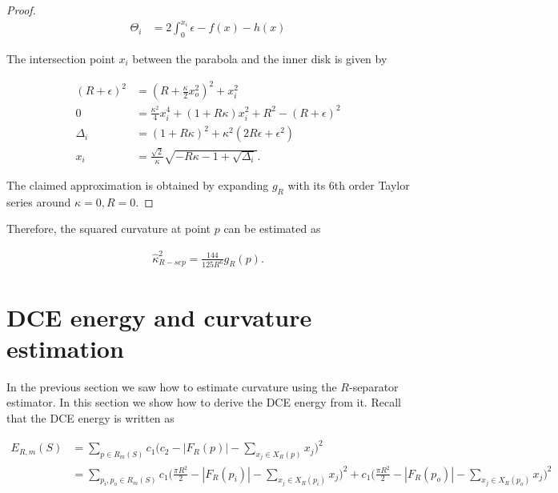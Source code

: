 \begin{proof}
\begin{align*}
	\Theta_i &= 2\int_{0}^{x_i}{\epsilon - f(x) - h(x)}	\end{align*}

The intersection point $x_i$ between the parabola and the inner disk is given by
	
\begin{align*}
	(R+\epsilon)^2 &= (R+\frac{\kappa}{2}x_o^2)^2 + x_i^2\\
	0 &= \frac{\kappa^2}{4}x_i^4 + (1+R\kappa)x_i^2 + R^2 - (R+\epsilon)^2	\\
\Delta_i &= (1+R\kappa)^2 + \kappa^2(2R\epsilon + \epsilon^2)\\
x_i &= \frac{\sqrt{2}}{\kappa}\sqrt{-R\kappa-1+\sqrt{\Delta_i}}.
\end{align*}

The claimed approximation is obtained by expanding $g_R$ with its  6th order Taylor series around $\kappa=0,R=0$.
\end{proof}

Therefore, the squared curvature at point $p$ can be estimated as

\begin{align*}
	\hat{\kappa}_{R-sep} ^2 = \frac{144}{125R^6}g_R(p) .
\end{align*}

\section{DCE energy and curvature estimation}

In the previous section we saw how to estimate curvature using the $R$-separator estimator. In this section we show how to derive the DCE energy from it. Recall that the DCE energy is written as

\begin{align*}
  E_{R,m}(S) &=  \sum_{p \in R_m(S)}{ c_1\Big( c_2 - |F_{R}(p)| - \sum_{x_j \in X_R(p)} {x_j} \Big)^2 } \\
  	  &= \sum_{p_i,p_o \in R_m(S)} c_1\Big( \frac{\pi R^2}{2} - |F_{R}(p_i)| - \sum_{x_j \in X_{R}(p_{i})} {x_j} \Big)^2 + c_1\Big( \frac{\pi R^2}{2} - |F_{R}(p_o)| - \sum_{x_j \in X_{R}(p_{o})} {x_j} \Big)^2
\end{align*}



